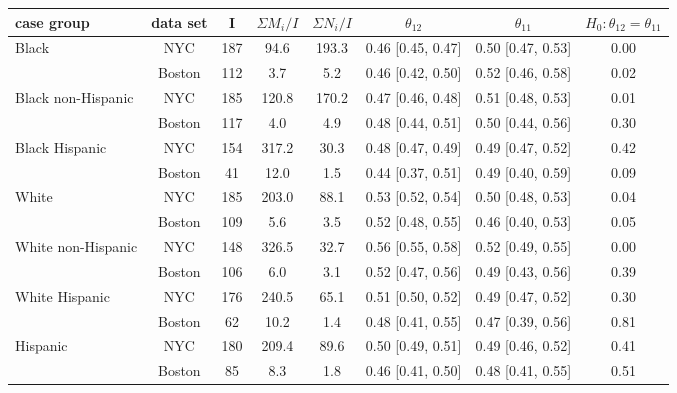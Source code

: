 \begin{tabular}{|l||c|c|c|c|c|c|c|}
  \hline
case group & data set & I & $\Sigma M_i/I$ & $\Sigma N_i/I$ & $\theta_{12}$ & $\theta_{11}$ & $H_{0}:\theta_{12}=\theta_{11}$ \\ 
  \hline
 \hline
Black & NYC & 187 & 94.6 & 193.3 & 0.46 [0.45, 0.47] & 0.50 [0.47, 0.53] & 0.00 \\ 
   & Boston & 112 & 3.7 & 5.2 & 0.46 [0.42, 0.50] & 0.52 [0.46, 0.58] & 0.02 \\ 
  Black non-Hispanic & NYC & 185 & 120.8 & 170.2 & 0.47 [0.46, 0.48] & 0.51 [0.48, 0.53] & 0.01 \\ 
   & Boston & 117 & 4.0 & 4.9 & 0.48 [0.44, 0.51] & 0.50 [0.44, 0.56] & 0.30 \\ 
  Black Hispanic & NYC & 154 & 317.2 & 30.3 & 0.48 [0.47, 0.49] & 0.49 [0.47, 0.52] & 0.42 \\ 
   & Boston & 41 & 12.0 & 1.5 & 0.44 [0.37, 0.51] & 0.49 [0.40, 0.59] & 0.09 \\ 
  White & NYC & 185 & 203.0 & 88.1 & 0.53 [0.52, 0.54] & 0.50 [0.48, 0.53] & 0.04 \\ 
   & Boston & 109 & 5.6 & 3.5 & 0.52 [0.48, 0.55] & 0.46 [0.40, 0.53] & 0.05 \\ 
  White non-Hispanic & NYC & 148 & 326.5 & 32.7 & 0.56 [0.55, 0.58] & 0.52 [0.49, 0.55] & 0.00 \\ 
   & Boston & 106 & 6.0 & 3.1 & 0.52 [0.47, 0.56] & 0.49 [0.43, 0.56] & 0.39 \\ 
  White Hispanic & NYC & 176 & 240.5 & 65.1 & 0.51 [0.50, 0.52] & 0.49 [0.47, 0.52] & 0.30 \\ 
   & Boston & 62 & 10.2 & 1.4 & 0.48 [0.41, 0.55] & 0.47 [0.39, 0.56] & 0.81 \\ 
  Hispanic & NYC & 180 & 209.4 & 89.6 & 0.50 [0.49, 0.51] & 0.49 [0.46, 0.52] & 0.41 \\ 
   & Boston & 85 & 8.3 & 1.8 & 0.46 [0.41, 0.50] & 0.48 [0.41, 0.55] & 0.51 \\ 
   \hline
\end{tabular}
